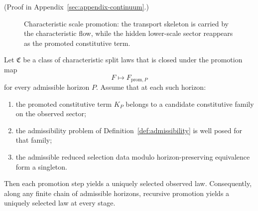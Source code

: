 (Proof in Appendix~\ref{sec:appendix-continuum}.)

\begin{figure}[ht]
\centering
{}
\caption{Characteristic scale promotion: the transport skeleton is carried by
the characteristic flow, while the hidden lower-scale sector reappears as the
promoted constitutive term.}
\label{fig:scale-promotion}
\end{figure}

\begin{corollary}
\label{cor:admissible-promotion}
Let $\mathfrak C$ be a class of characteristic split laws that is closed under
the promotion map
\[
F \longmapsto F_{\mathrm{prom},P}
\]
for every admissible horizon $P$. Assume that at each such horizon:
\begin{enumerate}[label=(\roman*), leftmargin=2em, itemsep=0.2em]
\item the promoted constitutive term $K_P$ belongs to a candidate constitutive
      family on the observed sector;
\item the admissibility problem of Definition~\ref{def:admissibility} is well
      posed for that family;
\item the admissible reduced selection data modulo horizon-preserving
      equivalence form a singleton.
\end{enumerate}
Then each promotion step yields a uniquely selected observed law. Consequently,
along any finite chain of admissible horizons, recursive promotion yields a
uniquely selected law at every stage.
\end{corollary}

